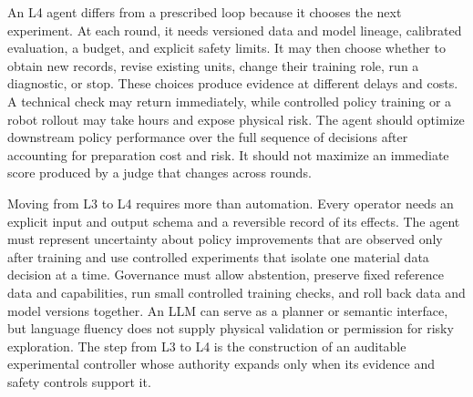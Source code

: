 

An L4 agent differs from a prescribed loop because it chooses the next experiment.
At each round, it needs versioned data and model lineage, calibrated evaluation, a budget, and explicit safety limits.
It may then choose whether to obtain new records, revise existing units, change their training role, run a diagnostic, or stop.
These choices produce evidence at different delays and costs.
A technical check may return immediately, while controlled policy training or a robot rollout may take hours and expose physical risk.
The agent should optimize downstream policy performance over the full sequence of decisions after accounting for preparation cost and risk.
It should not maximize an immediate score produced by a judge that changes across rounds.

Moving from L3 to L4 requires more than automation.
Every operator needs an explicit input and output schema and a reversible record of its effects.
The agent must represent uncertainty about policy improvements that are observed only after training and use controlled experiments that isolate one material data decision at a time.
Governance must allow abstention, preserve fixed reference data and capabilities, run small controlled training checks, and roll back data and model versions together.
An LLM can serve as a planner or semantic interface, but language fluency does not supply physical validation or permission for risky exploration.
The step from L3 to L4 is the construction of an auditable experimental controller whose authority expands only when its evidence and safety controls support it.
